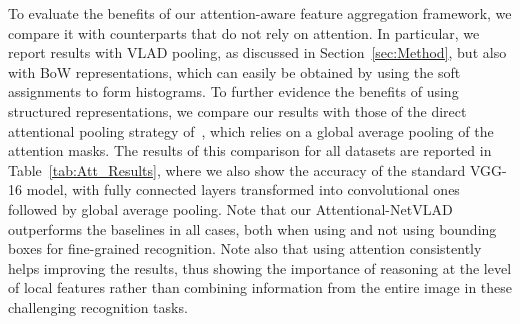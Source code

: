 \documentclass{bmvc2k}
\newcommand{\MS}[1]{{\color{blue}{\bf #1}}}
\newcommand{\KN}[1]{{\color{red}{\bf #1}}}
\newcommand{\MS}[1]{}
\newcommand{\KN}[1]{}
\begin{document}
To evaluate the benefits of our attention-aware feature aggregation framework, we compare it with counterparts that do not rely on attention. In particular, we report results with VLAD pooling, as discussed in Section~\ref{sec:Method}, but also with BoW representations, which can easily be obtained by using the soft assignments to form histograms. 
To further evidence the benefits of using structured representations, we compare our results with those of the direct attentional pooling strategy of~\cite{Attpool}, which relies on a global average pooling of the attention masks. The results of this comparison for all datasets are reported in Table~\ref{tab:Att_Results}, where we also show the accuracy of the standard VGG-16 model, with fully connected layers transformed into convolutional ones followed by global average pooling. 
Note that our Attentional-NetVLAD outperforms the baselines in all cases, both when using and not using bounding boxes for fine-grained recognition. Note also that using attention consistently helps improving the results,
thus showing the importance of reasoning at the level of local features rather than combining information from the entire image in these challenging recognition tasks. 
\end{document}
